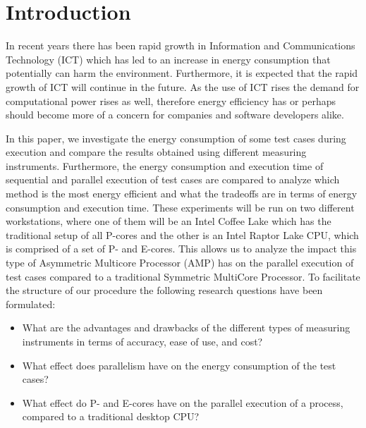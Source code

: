 \section{Introduction}

In recent years there has been rapid growth in Information and Communications Technology (ICT) which has led to an increase in energy consumption that potentially can harm the environment. Furthermore, it is expected that the rapid growth of ICT will continue in the future. \cite{jones2018stop,andrae2015global} As the use of ICT rises the demand for computational power rises as well, therefore energy efficiency has or perhaps should become more of a concern for companies and software developers alike.

In this paper, we investigate the energy consumption of some test cases during execution and compare the results obtained using different measuring instruments. Furthermore, the energy consumption and execution time of sequential and parallel execution of test cases are compared to analyze which method is the most energy efficient and what the tradeoffs are in terms of energy consumption and execution time. These experiments will be run on two different workstations, where one of them will be an Intel Coffee Lake which has the traditional setup of all P-cores and the other is an Intel Raptor Lake CPU, which is comprised of a set of P- and E-cores. This allows us to analyze the impact this type of Asymmetric Multicore Processor (AMP) has on the parallel execution of test cases compared to a traditional Symmetric MultiCore Processor. To facilitate the structure of our procedure the following research questions have been formulated:

\begin{itemize}
    \item What are the advantages and drawbacks of the different types of measuring instruments in terms of accuracy, ease of use, and cost?
    \item What effect does parallelism have on the energy consumption of the test cases?
    \item What effect do P- and E-cores have on the parallel execution of a process, compared to a traditional desktop CPU?
\end{itemize}

